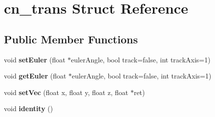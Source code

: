 \hypertarget{structcn__trans}{\section{cn\-\_\-trans Struct Reference}
\label{structcn__trans}
}
\subsection*{Public Member Functions}
\begin{DoxyCompactItemize}
\item 
\hypertarget{structcn__trans_a300558c8799df35b10c7908a9bde9275}{void {\bfseries set\-Euler} (float $\ast$euler\-Angle, bool track=false, int track\-Axis=1)}\label{structcn__trans_a300558c8799df35b10c7908a9bde9275}

\item 
\hypertarget{structcn__trans_a6bee6a8c63bbe2735c348c95b4a6948a}{void {\bfseries get\-Euler} (float $\ast$euler\-Angle, bool track=false, int track\-Axis=1)}\label{structcn__trans_a6bee6a8c63bbe2735c348c95b4a6948a}

\item 
\hypertarget{structcn__trans_a16408476bf5044cc5ba2c55d9da3150a}{void {\bfseries set\-Vec} (float x, float y, float z, float $\ast$ret)}\label{structcn__trans_a16408476bf5044cc5ba2c55d9da3150a}

\item 
\hypertarget{structcn__trans_aa6e3fad132cd61da7915b5ae73b03ba4}{void {\bfseries identity} ()}\label{structcn__trans_aa6e3fad132cd61da7915b5ae73b03ba4}

\end{DoxyCompactItemize}
